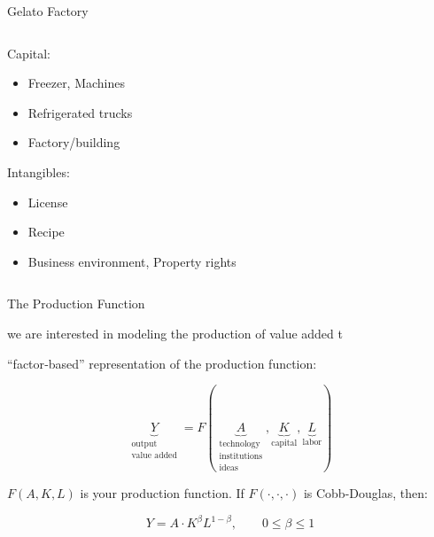 \documentclass[notes,11pt, aspectratio=169, xcolor=table]{beamer}
\newenvironment{wideitemize}{\itemize\addtolength{\itemsep}{10pt}}{\enditemize}
\begin{document}
\begin{frame}{Gelato Factory}
\begin{columns}[T]
\begin{column}{.6\textwidth}
\begin{wideitemize}
\begin{itemize}
    \end{itemize}
    \item Capital:
    \begin{itemize}
        \item Freezer, Machines 
        \item Refrigerated trucks
        \item Factory/building
    \end{itemize}
    \item Intangibles:
    \begin{itemize}
        \item License
        \item Recipe
        \item Business environment, Property rights
    \end{itemize}
    
  \end{wideitemize}
\end{column}%
\end{columns}

\end{frame}


\begin{frame}{The Production Function}

\begin{wideitemize}
\item we are interested in modeling the production of value added
t
\item “factor‐based” representation of the production function:

\begin{equation*}
\underbrace{Y}_{\substack{\text{output}\\\text{value added}}} = F(\underbrace{A}_{\substack{\text{technology}\\\text{institutions}\\\text{ideas}}}, \underbrace{K}_{\text{capital}} , \underbrace{L}_{\text{labor}})
\end{equation*}

\item $F(A, K, L)$ is your production function. If $F(\cdot, \cdot, \cdot)$ is Cobb-Douglas, then:

\begin{equation*}
    Y = A \cdot K^{\beta} L^{1-\beta}, \qquad 0 \le \beta \le 1  
\end{equation*}

\end{wideitemize}

\end{frame}
\end{document}
